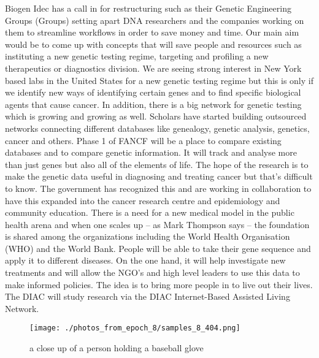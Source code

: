 \documentclass{article}%
\begin{document}
Biogen Idec has a call in for restructuring such as their Genetic Engineering Groups (Groups) setting apart DNA researchers and the companies working on them to streamline workflows in order to save money and time.\newline%
Our main aim would be to come up with concepts that will save people and resources such as instituting a new genetic testing regime, targeting and profiling a new therapeutics or diagnostics division. We are seeing strong interest in New York based labs in the United States for a new genetic testing regime but this is only if we identify new ways of identifying certain genes and to find specific biological agents that cause cancer.\newline%
In addition, there is a big network for genetic testing which is growing and growing as well.\newline%
Scholars have started building outsourced networks connecting different databases like genealogy, genetic analysis, genetics, cancer and others.\newline%
Phase 1 of FANCF will be a place to compare existing databases and to compare genetic information. It will track and analyse more than just genes but also all of the elements of life.\newline%
The hope of the research is to make the genetic data useful in diagnosing and treating cancer but that’s difficult to know. The government has recognized this and are working in collaboration to have this expanded into the cancer research centre and epidemiology and community education.\newline%
There is a need for a new medical model in the public health arena and when one scales up – as Mark Thompson says – the foundation is shared among the organizations including the World Health Organisation (WHO) and the World Bank.\newline%
People will be able to take their gene sequence and apply it to different diseases. On the one hand, it will help investigate new treatments and will allow the NGO’s and high level leaders to use this data to make informed policies.\newline%
The idea is to bring more people in to live out their lives. The DIAC will study research via the DIAC Internet{-}Based Assisted Living Network.\newline%

%


\begin{figure}[h!]%
\centering%
\texttt{[image: ./photos\_from\_epoch\_8/samples\_8\_404.png]}%
\caption{a close up of a person holding a baseball glove}%
\end{figure}

%
\end{document}
